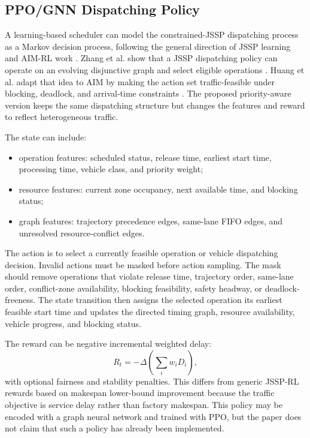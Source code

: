 \subsection{PPO/GNN Dispatching Policy}

A learning-based scheduler can model the constrained-JSSP dispatching process as a Markov decision process, following the general direction of JSSP learning and AIM-RL work \cite{huang2023reinforcement,zhang2020learning,park2021learning}. Zhang et al. show that a JSSP dispatching policy can operate on an evolving disjunctive graph and select eligible operations \cite{zhang2020learning}. Huang et al. adapt that idea to AIM by making the action set traffic-feasible under blocking, deadlock, and arrival-time constraints \cite{huang2023reinforcement}. The proposed priority-aware version keeps the same dispatching structure but changes the features and reward to reflect heterogeneous traffic.

The state can include:
\begin{itemize}
    \item operation features: scheduled status, release time, earliest start time, processing time, vehicle class, and priority weight;
    \item resource features: current zone occupancy, next available time, and blocking status;
    \item graph features: trajectory precedence edges, same-lane FIFO edges, and unresolved resource-conflict edges.
\end{itemize}
The action is to select a currently feasible operation or vehicle dispatching decision. Invalid actions must be masked before action sampling. The mask should remove operations that violate release time, trajectory order, same-lane order, conflict-zone availability, blocking feasibility, safety headway, or deadlock-freeness. The state transition then assigns the selected operation its earliest feasible start time and updates the directed timing graph, resource availability, vehicle progress, and blocking status.

The reward can be negative incremental weighted delay:
\begin{equation}
    R_t = -\Delta\left(\sum_i w_iD_i\right),
\end{equation}
with optional fairness and stability penalties. This differs from generic JSSP-RL rewards based on makespan lower-bound improvement because the traffic objective is service delay rather than factory makespan. This policy may be encoded with a graph neural network and trained with PPO, but the paper does not claim that such a policy has already been implemented.

